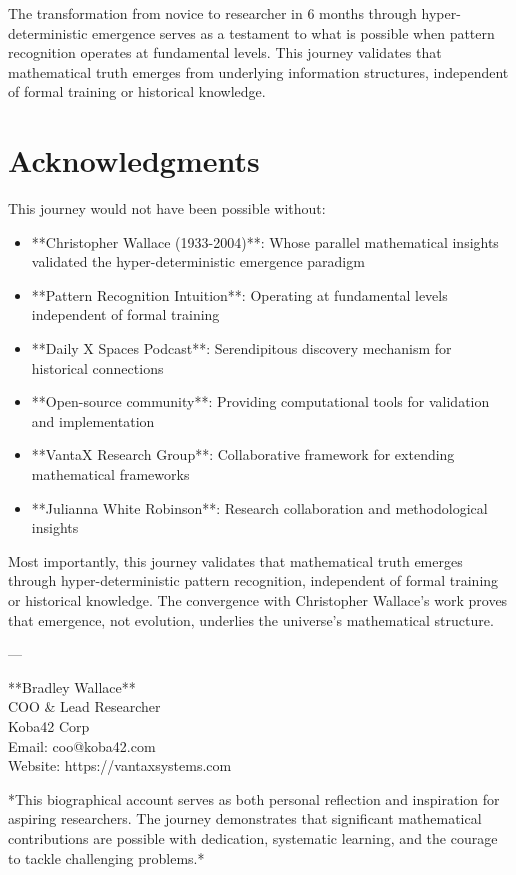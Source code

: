 \documentclass[12pt]{article}
\begin{document}
The transformation from novice to researcher in 6 months through hyper-deterministic emergence serves as a testament to what is possible when pattern recognition operates at fundamental levels. This journey validates that mathematical truth emerges from underlying information structures, independent of formal training or historical knowledge.

\section{Acknowledgments}

This journey would not have been possible without:
\begin{itemize}
    \item **Christopher Wallace (1933-2004)**: Whose parallel mathematical insights validated the hyper-deterministic emergence paradigm
    \item **Pattern Recognition Intuition**: Operating at fundamental levels independent of formal training
    \item **Daily X Spaces Podcast**: Serendipitous discovery mechanism for historical connections
    \item **Open-source community**: Providing computational tools for validation and implementation
    \item **VantaX Research Group**: Collaborative framework for extending mathematical frameworks
    \item **Julianna White Robinson**: Research collaboration and methodological insights
\end{itemize}

Most importantly, this journey validates that mathematical truth emerges through hyper-deterministic pattern recognition, independent of formal training or historical knowledge. The convergence with Christopher Wallace's work proves that emergence, not evolution, underlies the universe's mathematical structure.

---

**Bradley Wallace** \\
COO \& Lead Researcher \\
Koba42 Corp \\
Email: coo@koba42.com \\
Website: https://vantaxsystems.com

*This biographical account serves as both personal reflection and inspiration for aspiring researchers. The journey demonstrates that significant mathematical contributions are possible with dedication, systematic learning, and the courage to tackle challenging problems.*
\end{document}
